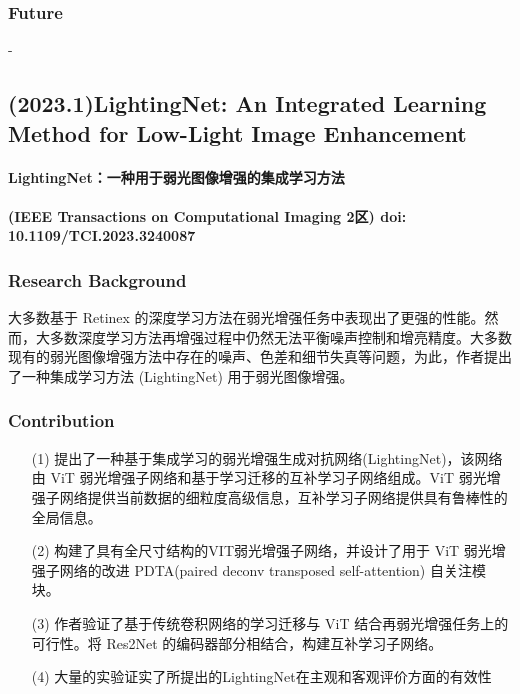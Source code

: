 \documentclass[letterpaper,10pt]{article}
\begin{document}
			\subsubsection{Future}
			
			-
			
		\subsection{(2023.1)LightingNet: An Integrated Learning Method for Low-Light Image Enhancement}
		
		\paragraph{LightingNet：一种用于弱光图像增强的集成学习方法}
		
		\paragraph{(IEEE Transactions on Computational Imaging 2区) doi: 10.1109/TCI.2023.3240087}
		
			\subsubsection{Research Background}
			
			大多数基于 Retinex 的深度学习方法在弱光增强任务中表现出了更强的性能。然而，大多数深度学习方法再增强过程中仍然无法平衡噪声控制和增亮精度。大多数现有的弱光图像增强方法中存在的噪声、色差和细节失真等问题，为此，作者提出了一种集成学习方法 (LightingNet) 用于弱光图像增强。
			
			\subsubsection{Contribution}

			\begin{itemize}
				\item[(1)] 
				提出了一种基于集成学习的弱光增强生成对抗网络(LightingNet)，该网络由 ViT 弱光增强子网络和基于学习迁移的互补学习子网络组成。ViT 弱光增强子网络提供当前数据的细粒度高级信息，互补学习子网络提供具有鲁棒性的全局信息。
				
				\item[(2)]
				构建了具有全尺寸结构的VIT弱光增强子网络，并设计了用于 ViT 弱光增强子网络的改进 PDTA(paired deconv transposed self-attention) 自关注模块。

				\item[(3)]
				作者验证了基于传统卷积网络的学习迁移与 ViT 结合再弱光增强任务上的可行性。将 Res2Net 的编码器部分相结合，构建互补学习子网络。
				
				\item[(4)]
				大量的实验证实了所提出的LightingNet在主观和客观评价方面的有效性
			\end{itemize}	
\end{document}
